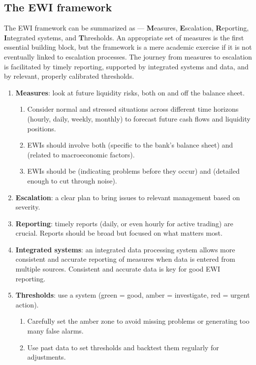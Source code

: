\subsection{The EWI framework}


\begin{lrdefbox}[M.E.R.I.T.]
The EWI framework can be summarized as  — \textbf{M}easures, \textbf{E}scalation, \textbf{R}eporting, \textbf{I}ntegrated systems, and \textbf{T}hresholds. An appropriate set of measures is the first essential building block, but the framework is a mere academic exercise if it is not eventually linked to escalation processes. The journey from measures to escalation is facilitated by timely reporting, supported by integrated systems and data, and by relevant, properly calibrated thresholds.
\end{lrdefbox}

\begin{enumerate}
\item \textbf{Measures}: look at future liquidity risks, both on and off the balance sheet.
  \begin{enumerate}[label=\alph*)]
  \item Consider normal and stressed situations across different time horizons (hourly, daily, weekly, monthly) to forecast future cash flows and liquidity positions.
  \item EWIs should involve both  (specific to the bank's balance sheet) and  (related to macroeconomic factors).
  \item EWIs should be  (indicating problems before they occur) and  (detailed enough to cut through noise).
  \end{enumerate}
\item \textbf{Escalation}: a clear plan to bring issues to relevant management based on severity.
\item \textbf{Reporting}: timely reports (daily, or even hourly for active trading) are crucial. Reports should be broad but focused on what matters most.
\item \textbf{Integrated systems}: an integrated data processing system allows more consistent and accurate reporting of measures when data is entered from multiple sources. Consistent and accurate data is key for good EWI reporting.
\item \textbf{Thresholds}: use a  system (green = good, amber = investigate, red = urgent action).
  \begin{enumerate}
  \item Carefully set the amber zone to avoid missing problems or generating too many false alarms.
  \item Use past data to set thresholds and backtest them regularly for adjustments.
  \end{enumerate}
\end{enumerate}

